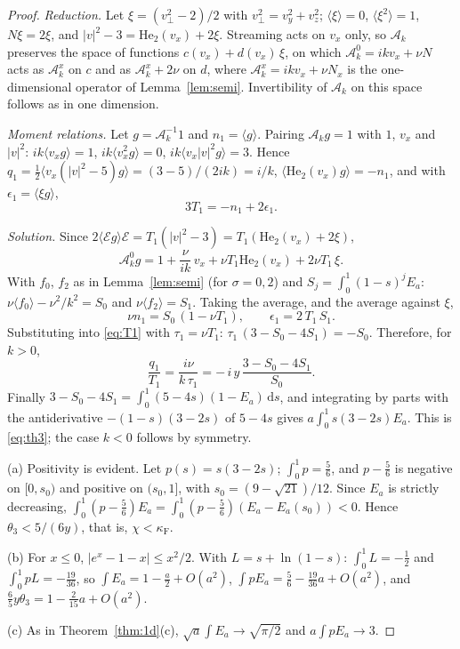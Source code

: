 \documentclass[11pt]{article}
\newcommand{\dd}{\mathrm{d}}
\newcommand{\He}{\mathrm{He}}
\newcommand{\cA}{\mathcal{A}}
\newcommand{\avg}[1]{\langle #1\rangle}
\theoremstyle{remark}
\begin{document}
\begin{proof}
\emph{Reduction.} Let $\xi=(v_\perp^2-2)/2$ with $v_\perp^2=v_y^2+v_z^2$;
$\avg{\xi}=0$, $\avg{\xi^2}=1$, $N\xi=2\xi$, and
$|v|^2-3=\He_2(v_x)+2\xi$. Streaming acts on $v_x$ only, so $\cA_k$
preserves the space of functions $c(v_x)+d(v_x)\,\xi$, on which
$\cA^0_k=ikv_x+\nu N$ acts as $\cA^x_k$ on $c$ and as $\cA^x_k+2\nu$ on $d$,
where $\cA^x_k=ikv_x+\nu N_x$ is the one-dimensional operator of
Lemma~\ref{lem:semi}. Invertibility of $\cA_k$ on this space follows as in
one dimension.

\emph{Moment relations.} Let $g=\cA_k^{-1}1$ and $n_1=\avg{g}$. Pairing
$\cA_kg=1$ with $1$, $v_x$ and $|v|^2$:
$ik\avg{v_xg}=1$, $ik\avg{v_x^2g}=0$, $ik\avg{v_x|v|^2g}=3$. Hence
$q_1=\tfrac12\avg{v_x(|v|^2-5)g}=(3-5)/(2ik)=i/k$,
$\avg{\He_2(v_x)g}=-n_1$, and with $\epsilon_1=\avg{\xi g}$,
\begin{equation}
  3T_1 = -n_1+2\epsilon_1 .
  \label{eq:T1}
\end{equation}

\emph{Solution.} Since
$2\avg{\mathcal{E}g}\mathcal{E}=T_1(|v|^2-3)=T_1(\He_2(v_x)+2\xi)$,
\[
  \cA^0_kg = 1+\frac{\nu}{ik}\,v_x+\nu T_1\He_2(v_x)+2\nu T_1\,\xi .
\]
With $f_0$, $f_2$ as in Lemma~\ref{lem:semi} (for $\sigma=0,2$) and
$S_j=\int_0^1(1-s)^jE_a$: $\nu\avg{f_0}-\nu^2/k^2=S_0$ and
$\nu\avg{f_2}=S_1$. Taking the average, and the average against $\xi$,
\[
  \nu n_1 = S_0\,(1-\nu T_1),\qquad \epsilon_1 = 2\,T_1\,S_1 .
\]
Substituting into \eqref{eq:T1} with $\tau_1=\nu T_1$:
$\tau_1\,(3-S_0-4S_1)=-S_0$. Therefore, for $k>0$,
\[
  \frac{q_1}{T_1} = \frac{i\nu}{k\,\tau_1}
  = -\,i\,y\,\frac{3-S_0-4S_1}{S_0}.
\]
Finally $3-S_0-4S_1=\int_0^1(5-4s)(1-E_a)\,\dd s$, and integrating by parts
with the antiderivative $-(1-s)(3-2s)$ of $5-4s$ gives
$a\int_0^1s(3-2s)E_a$. This is \eqref{eq:th3}; the case $k<0$ follows by
symmetry.

(a) Positivity is evident. Let $p(s)=s(3-2s)$; $\int_0^1p=\tfrac56$, and
$p-\tfrac56$ is negative on $[0,s_0)$ and positive on $(s_0,1]$, with
$s_0=(9-\sqrt{21})/12$. Since $E_a$ is strictly decreasing,
$\int_0^1(p-\tfrac56)E_a=\int_0^1(p-\tfrac56)(E_a-E_a(s_0))<0$. Hence
$\theta_3<5/(6y)$, that is, $\chi<\kappa_{\mathrm F}$.

(b) For $x\le0$, $|e^x-1-x|\le x^2/2$. With $L=s+\ln(1-s)$:
$\int_0^1L=-\tfrac12$ and $\int_0^1pL=-\tfrac{19}{36}$, so
$\int E_a=1-\tfrac a2+O(a^2)$,
$\int pE_a=\tfrac56-\tfrac{19}{36}a+O(a^2)$, and
$\tfrac65y\theta_3=1-\tfrac{2}{15}a+O(a^2)$.

(c) As in Theorem~\ref{thm:1d}(c), $\sqrt a\int E_a\to\sqrt{\pi/2}$ and
$a\int pE_a\to3$.
\end{proof}
\end{document}
